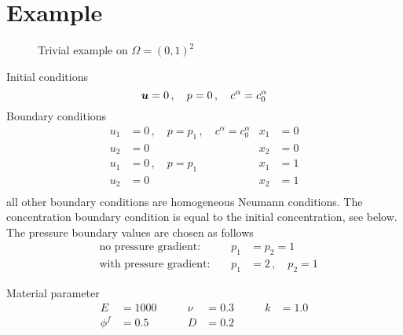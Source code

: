 \documentclass[a4paper,DIV=12,10pt]{scrartcl}
\newcommand{\U}[0]{\vek{u}}
\begin{document}
\section{Example}
\label{sec:ex}

\begin{figure}[htbp]
  \centering
  \caption{Trivial example on $\Omega = (0,1)^2$}
  \label{fig:trivial}
\end{figure}

Initial conditions
\begin{equation}
  \label{eq:initial}
  \U = 0\,,\quad p=0\,, \quad c^\alpha = c^\alpha_0
\end{equation}
Boundary conditions
\begin{equation}
  \label{eq:boundary}
  \begin{aligned}
    u_1 &=0\,, \quad p = p_1\,, \quad c^\alpha = c^\alpha_0 &x_1 &= 0\\
    u_2 &=0  &x_2 &= 0\\
    u_1 &=0\,, \quad p = p_1  &x_1 &= 1\\
    u_2 &=0  &x_2 &= 1\\
  \end{aligned}
\end{equation}
all other boundary conditions are homogeneous Neumann conditions.
The concentration boundary condition is equal to the initial concentration,
see below. The pressure boundary values are chosen as follows
\begin{equation}
  \label{eq:pressureBC}
  \begin{aligned}
    &\text{no pressure gradient:}\qquad &p_1 &=p_2 = 1 \\
    &\text{with pressure gradient:}    &p_1  &=2 \,,\quad p_2 = 1
  \end{aligned}
\end{equation}

Material parameter
\begin{equation}
  \label{eq:material}
  \begin{aligned}
    E &= 1000 \qquad &\nu &= 0.3 \qquad   &k &= 1.0\\
    \phi^f &= 0.5 &D &= 0.2
  \end{aligned}
\end{equation}
\end{document}
